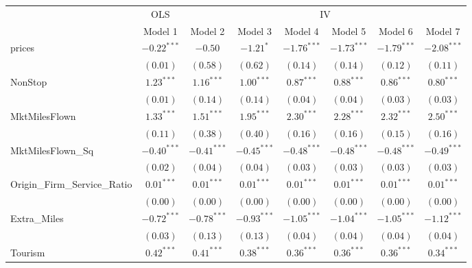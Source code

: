 
\begin{tabular}{l c c c c c c c}
\toprule
 & \multicolumn{1}{c}{OLS} & \multicolumn{6}{c}{IV} \\
\cmidrule(lr){2-2} \cmidrule(lr){3-8}
 & Model 1 & Model 2 & Model 3 & Model 4 & Model 5 & Model 6 & Model 7 \\
\midrule
prices                       & $-0.22^{***}$ & $-0.50$       & $-1.21^{*}$   & $-1.76^{***}$ & $-1.73^{***}$    & $-1.79^{***}$ & $-2.08^{***}$  \\
                             & $(0.01)$      & $(0.58)$      & $(0.62)$      & $(0.14)$      & $(0.14)$         & $(0.12)$      & $(0.11)$       \\
NonStop                      & $1.23^{***}$  & $1.16^{***}$  & $1.00^{***}$  & $0.87^{***}$  & $0.88^{***}$     & $0.86^{***}$  & $0.80^{***}$   \\
                             & $(0.01)$      & $(0.14)$      & $(0.14)$      & $(0.04)$      & $(0.04)$         & $(0.03)$      & $(0.03)$       \\
MktMilesFlown                & $1.33^{***}$  & $1.51^{***}$  & $1.95^{***}$  & $2.30^{***}$  & $2.28^{***}$     & $2.32^{***}$  & $2.50^{***}$   \\
                             & $(0.11)$      & $(0.38)$      & $(0.40)$      & $(0.16)$      & $(0.16)$         & $(0.15)$      & $(0.16)$       \\
MktMilesFlown\_Sq            & $-0.40^{***}$ & $-0.41^{***}$ & $-0.45^{***}$ & $-0.48^{***}$ & $-0.48^{***}$    & $-0.48^{***}$ & $-0.49^{***}$  \\
                             & $(0.02)$      & $(0.04)$      & $(0.04)$      & $(0.03)$      & $(0.03)$         & $(0.03)$      & $(0.03)$       \\
Origin\_Firm\_Service\_Ratio & $0.01^{***}$  & $0.01^{***}$  & $0.01^{***}$  & $0.01^{***}$  & $0.01^{***}$     & $0.01^{***}$  & $0.01^{***}$   \\
                             & $(0.00)$      & $(0.00)$      & $(0.00)$      & $(0.00)$      & $(0.00)$         & $(0.00)$      & $(0.00)$       \\
Extra\_Miles                 & $-0.72^{***}$ & $-0.78^{***}$ & $-0.93^{***}$ & $-1.05^{***}$ & $-1.04^{***}$    & $-1.05^{***}$ & $-1.12^{***}$  \\
                             & $(0.03)$      & $(0.13)$      & $(0.13)$      & $(0.04)$      & $(0.04)$         & $(0.04)$      & $(0.04)$       \\
Tourism                      & $0.42^{***}$  & $0.41^{***}$  & $0.38^{***}$  & $0.36^{***}$  & $0.36^{***}$     & $0.36^{***}$  & $0.34^{***}$   \\

\end{tabular}
